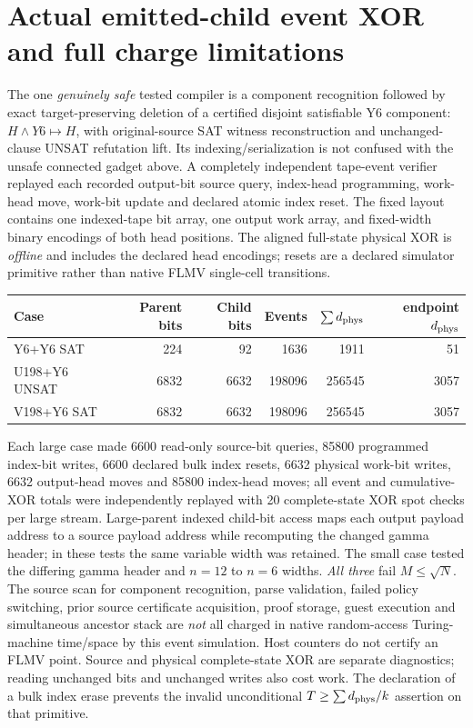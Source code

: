 \documentclass[11pt]{article}
\begin{document}
\section{Actual emitted-child event XOR and full charge limitations}
The one \emph{genuinely safe} tested compiler is a component recognition followed by exact target-preserving deletion of a certified disjoint satisfiable Y6 component: $H\wedge Y6\mapsto H$, with original-source SAT witness reconstruction and unchanged-clause UNSAT refutation lift. Its indexing/serialization is not confused with the unsafe connected gadget above. A completely independent tape-event verifier replayed each recorded output-bit source query, index-head programming, work-head move, work-bit update and declared atomic index reset. The fixed layout contains one indexed-tape bit array, one output work array, and fixed-width binary encodings of both head positions. The aligned full-state physical XOR is \emph{offline} and includes the declared head encodings; resets are a declared simulator primitive rather than native FLMV single-cell transitions.
\begin{center}\begin{tabular}{lrrrrr}\toprule
Case & Parent bits & Child bits & Events & $\sum d_{\rm phys}$ & endpoint $d_{\rm phys}$\\\midrule
Y6+Y6 SAT &224&92&1636&1911&51\\
U198+Y6 UNSAT &6832&6632&198096&256545&3057\\
V198+Y6 SAT &6832&6632&198096&256545&3057\\\bottomrule
\end{tabular}\end{center}
Each large case made 6600 read-only source-bit queries, 85800 programmed index-bit writes, 6600 declared bulk index resets, 6632 physical work-bit writes, 6632 output-head moves and 85800 index-head moves; all event and cumulative-XOR totals were independently replayed with 20 complete-state XOR spot checks per large stream. Large-parent indexed child-bit access maps each output payload address to a source payload address while recomputing the changed gamma header; in these tests the same variable width was retained. The small case tested the differing gamma header and $n=12$ to $n=6$ widths. \emph{All three} fail $M\le\sqrt N$. The source scan for component recognition, parse validation, failed policy switching, prior source certificate acquisition, proof storage, guest execution and simultaneous ancestor stack are \emph{not} all charged in native random-access Turing-machine time/space by this event simulation. Host counters do not certify an FLMV point. Source and physical complete-state XOR are separate diagnostics; reading unchanged bits and unchanged writes also cost work. The declaration of a bulk index erase prevents the invalid unconditional $T\ge\sum d_{\rm phys}/k$ assertion on that primitive.
\end{document}
